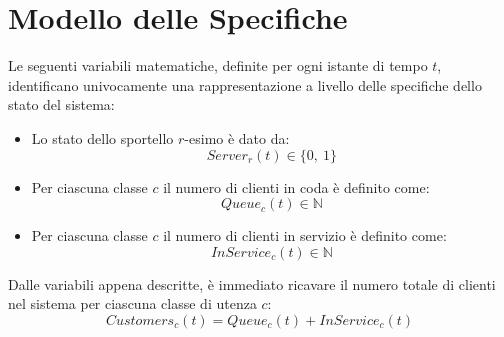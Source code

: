 \chapter{Modello delle Specifiche}\label{chp:modello-specifiche}
Le seguenti variabili matematiche, definite per ogni istante di tempo $t$, identificano univocamente una rappresentazione a livello delle specifiche dello stato del sistema:

\begin{itemize}
\item Lo stato dello sportello $r$-esimo è dato da:
\begin{equation}
\label{eqn:modello-specifiche-3}
Server_r(t) \in \lbrace 0,\ 1 \rbrace
\end{equation}
\item Per ciascuna classe $c$ il numero di clienti in coda è definito come:
\begin{equation}
\label{eqn:modello-specifiche-2}
Queue_c(t) \in \mathbb{N}
\end{equation}
\item Per ciascuna classe $c$ il numero di clienti in servizio è definito come:
\begin{equation}
\label{eqn:modello-specifiche-2}
InService_c(t) \in \mathbb{N}
\end{equation}
\end{itemize}

Dalle variabili appena descritte, è immediato ricavare il numero totale di clienti nel sistema per ciascuna classe di utenza $c$:
\begin{equation}
Customers_c(t) = Queue_c(t) + InService_c(t)
\end{equation}


